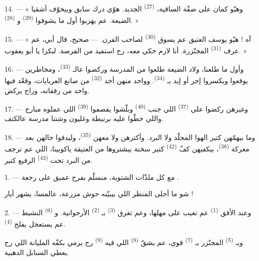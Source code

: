 14. --- « وهيّو كمان على ضفّة الساقية، 
\textsuperscript{(27)} الجديد. هوّي درك سابق وبيخوّف أشقيا الضيعة. عم
يهربوا أول ما يشوفوا  \textsuperscript{(29)}
و \textsuperscript{(28)}. »

15. --- « آه ! هيّو يوسف العتيق عم يسوق 
\textsuperscript{(30)} لصاحب الفرن. --- صحيح، قال أبي، عم عرف
 \textsuperscript{(31)} المجنّزرة. أنا لازم حكي معه، رح
استفيد من الفرصة. لبكرا يا أبو يعقوب. »

16. --- وأول ما طلعنا، ولاد الضيعة طلعوا من المدرسة وركضوا عالـ
\textsuperscript{(33)}، ومخاطرين يوقعوا ويكسروا إجر أو إيد
بـ \textsuperscript{(34)}. وواحد منهن أخد 
\textsuperscript{(32)} من صانع العربايات، وقعّد فيها واحد من رفقاته،
وراح يركض.

17. --- وغيرهن ركضوا على  \textsuperscript{(37)} اللي
جنب  \textsuperscript{(40)} وبلّشوا يقصفوا 
\textsuperscript{(39)} اللي عملوه مبارح واللي حطّوا عليه برنيطة وغليون
وشنتا مدرسة عالكتف.

18. --- وما بيهمّهن كتير الهوا المجلّد ولا البرد. وأكترهن ولا معهن
 \textsuperscript{(35)}، وليدفوا حالهن بعد معركة  \textsuperscript{(38)}، بيكفيهن كفّ 
\textsuperscript{(42)} كتير سخنة بيشتروها من  العتيقة
ياكوبينا، اللي عم ترجف من البرد تحت 
\textsuperscript{(43)} الرفيع كتير.

\VUsaut{3.0mm}
\VUsaut{3.0mm}

\VUsaut{4.0mm}

1. --- مع كل ملذّات الشتوية، منسلّم بفرح عميق على رجعة
.

شو ما أحلى المنظر اللي بيبيّنه حوش مزرعة، عالمسا، بشهر أيار !

2. --- وعند الأفق  \textsuperscript{(1)} عم تغيب على مهلها،
وعم تغرق  \textsuperscript{(3)} بـ
\textsuperscript{(2)} الأرجوانية. و \textsuperscript{(6)}
النشيط عم يستعجل يفلح  \textsuperscript{(4)}.

وبـ \textsuperscript{(5)} المجنّزر بـ
\textsuperscript{(7)} قوي، عم يشقّ  \textsuperscript{(8)} اللي
فيه  \textsuperscript{(9)} رح يرمي بكفّه المليانة
 اللي رح يعطي السنابل الدهبية.

